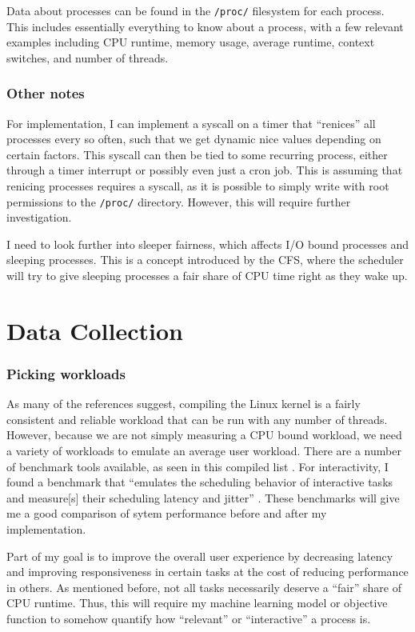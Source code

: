 \documentclass[12pt]{article}
\def\ind{\hspace*{0.3in}}
\begin{document}
Data about processes can be found in the \texttt{/proc/} filesystem for each process. This includes essentially everything to know about a process, with a few relevant examples including CPU runtime, memory usage, average runtime, context switches, and number of threads.

\subsubsection*{Other notes}

\ind For implementation, I can implement a syscall on a timer that ``renices'' all processes every so often, such that we get dynamic nice values depending on certain factors. This syscall can then be tied to some recurring process, either through a timer interrupt or possibly even just a cron job. This is assuming that renicing processes requires a syscall, as it is possible to simply write with root permissions to the \texttt{/proc/} directory. However, this will require further investigation.

I need to look further into sleeper fairness, which affects I/O bound processes and sleeping processes. This is a concept introduced by the CFS, where the scheduler will try to give sleeping processes a fair share of CPU time right as they wake up.

\section*{Data Collection}

\subsubsection*{Picking workloads}

\ind As many of the references suggest, compiling the Linux kernel is a fairly consistent and reliable workload that can be run with any number of threads. However, because we are not simply measuring a CPU bound workload, we need a variety of workloads to emulate an average user workload. There are a number of benchmark tools available, as seen in this compiled list \cite{LinuxBenchmarkScripts2019}. For interactivity, I found a benchmark that ``emulates the scheduling behavior of interactive tasks and measure[s] their scheduling latency and jitter'' \cite{kolivasCkolivasInterbench2020}. These benchmarks will give me a good comparison of sytem performance before and after my implementation.

Part of my goal is to improve the overall user experience by decreasing latency and improving responsiveness in certain tasks at the cost of reducing performance in others. As mentioned before, not all tasks necessarily deserve a ``fair'' share of CPU runtime. Thus, this will require my machine learning model or objective function to somehow quantify how ``relevant'' or ``interactive'' a process is.
\end{document}
